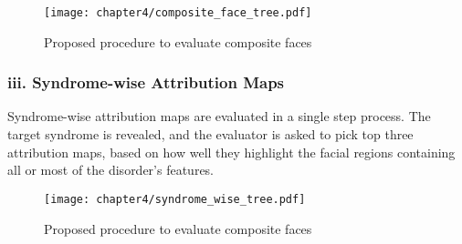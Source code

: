 \documentclass[../report.tex]{subfiles}
\begin{document}
	\begin{figure}[H]
		\hspace*{1cm}      
		\texttt{[image: chapter4/composite\_face\_tree.pdf]}
		\vspace*{4cm}
		\caption{Proposed procedure to evaluate composite faces}
		\label{fig_composite_flow}	
	\end{figure}

	\subsubsection{iii. Syndrome-wise Attribution Maps}
	Syndrome-wise attribution maps are evaluated in a single step process. The target syndrome is revealed, and the evaluator is asked to pick top three attribution maps, based on how well they highlight the facial regions containing all or most of the disorder's features.
	
	
	\begin{figure}[H]
		\hspace*{4.5cm}      
		\texttt{[image: chapter4/syndrome\_wise\_tree.pdf]}
		\caption{Proposed procedure to evaluate composite faces}
		\label{fig_composite_flow}	
	\end{figure}
\end{document}
